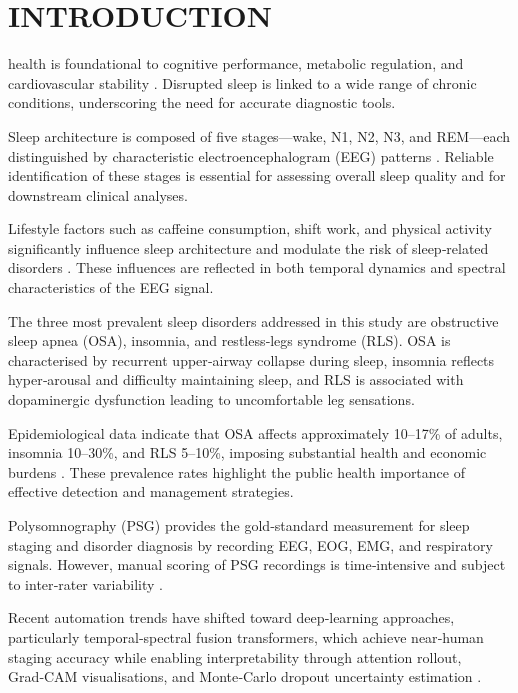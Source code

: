 \documentclass{ieeetj}
\begin{document}
\maketitle

\section{INTRODUCTION}
 health is foundational to cognitive performance, metabolic regulation, and cardiovascular stability \cite{berry2012aasm, berry2020aasm}. Disrupted sleep is linked to a wide range of chronic conditions, underscoring the need for accurate diagnostic tools.

Sleep architecture is composed of five stages—wake, N1, N2, N3, and REM—each distinguished by characteristic electroencephalogram (EEG) patterns \cite{supratak2017deepsleepnet, phan2022sleeptransformer}. Reliable identification of these stages is essential for assessing overall sleep quality and for downstream clinical analyses.

Lifestyle factors such as caffeine consumption, shift work, and physical activity significantly influence sleep architecture and modulate the risk of sleep‑related disorders \cite{fu2023tsanet, kim2018apna}. These influences are reflected in both temporal dynamics and spectral characteristics of the EEG signal.

The three most prevalent sleep disorders addressed in this study are obstructive sleep apnea (OSA), insomnia, and restless‑legs syndrome (RLS). OSA is characterised by recurrent upper‑airway collapse during sleep, insomnia reflects hyper‑arousal and difficulty maintaining sleep, and RLS is associated with dopaminergic dysfunction leading to uncomfortable leg sensations.

Epidemiological data indicate that OSA affects approximately 10–17\% of adults, insomnia 10–30\%, and RLS 5–10\%, imposing substantial health and economic burdens \cite{rashid2022osa, karthikeyan2023insomnet, seifollahi2023osarls}. These prevalence rates highlight the public health importance of effective detection and management strategies.

Polysomnography (PSG) provides the gold‑standard measurement for sleep staging and disorder diagnosis by recording EEG, EOG, EMG, and respiratory signals. However, manual scoring of PSG recordings is time‑intensive and subject to inter‑rater variability \cite{berry2020aasm, jha2024slumbernet}.

Recent automation trends have shifted toward deep‑learning approaches, particularly temporal‑spectral fusion transformers, which achieve near‑human staging accuracy while enabling interpretability through attention rollout, Grad‑CAM visualisations, and Monte‑Carlo dropout uncertainty estimation \cite{cong2025bits, sun2025adg, phan2022sleeptransformer}.
\end{document}

